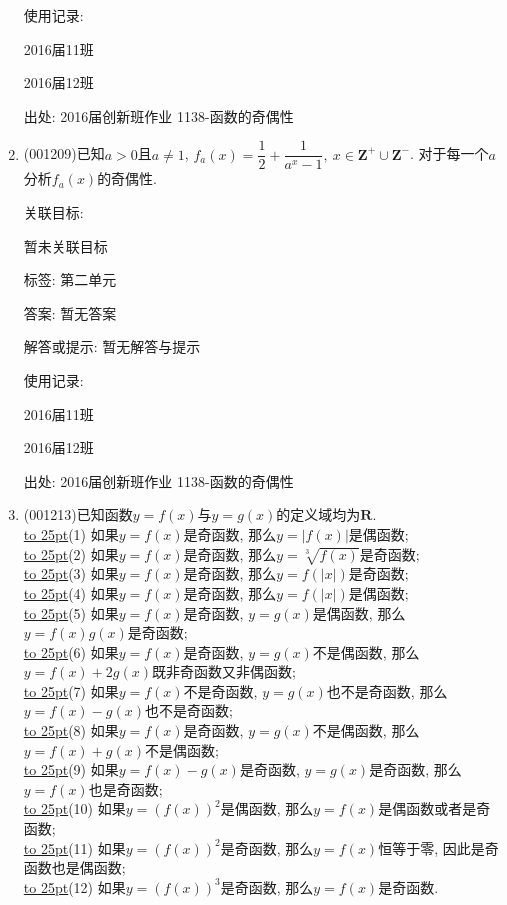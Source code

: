 \documentclass[10pt,a4paper]{article}
\newcommand{\blank}[1]{\underline{\hbox to #1pt{}}}
\begin{document}
\begin{enumerate}[1.]
使用记录:

2016届11班	

2016届12班	


出处: 2016届创新班作业	1138-函数的奇偶性
\item { (001209)}已知$a>0$且$a\ne 1$, $f_a(x)=\dfrac{1}{2}+\dfrac{1}{a^x-1},\ x \in \mathbf{Z}^+\cup \mathbf{Z}^-$. 对于每一个$a$分析$f_a(x)$的奇偶性.


关联目标:

暂未关联目标



标签: 第二单元

答案: 暂无答案

解答或提示: 暂无解答与提示

使用记录:

2016届11班	

2016届12班	


出处: 2016届创新班作业	1138-函数的奇偶性
\item { (001213)}已知函数$y=f(x)$与$y=g(x)$的定义域均为$\mathbf{R}$.\\ 
\blank{25}(1) 如果$y=f(x)$是奇函数, 那么$y=|f(x)|$是偶函数;\\ 
\blank{25}(2) 如果$y=f(x)$是奇函数, 那么$y=\sqrt[3]{f(x)}$是奇函数;\\ 
\blank{25}(3) 如果$y=f(x)$是奇函数, 那么$y=f(|x|)$是奇函数;\\ 
\blank{25}(4) 如果$y=f(x)$是奇函数, 那么$y=f(|x|)$是偶函数;\\ 
\blank{25}(5) 如果$y=f(x)$是奇函数, $y=g(x)$是偶函数, 那么$y=f(x)g(x)$是奇函数;\\ 
\blank{25}(6) 如果$y=f(x)$是奇函数, $y=g(x)$不是偶函数, 那么$y=f(x)+2g(x)$既非奇函数又非偶函数;\\ 
\blank{25}(7) 如果$y=f(x)$不是奇函数, $y=g(x)$也不是奇函数, 那么$y=f(x)-g(x)$也不是奇函数;\\ 
\blank{25}(8) 如果$y=f(x)$是奇函数, $y=g(x)$不是偶函数, 那么$y=f(x)+g(x)$不是偶函数;\\ 
\blank{25}(9) 如果$y=f(x)-g(x)$是奇函数, $y=g(x)$是奇函数, 那么$y=f(x)$也是奇函数;\\ 
\blank{25}(10) 如果$y=(f(x))^2$是偶函数, 那么$y=f(x)$是偶函数或者是奇函数;\\ 
\blank{25}(11) 如果$y=(f(x))^2$是奇函数, 那么$y=f(x)$恒等于零, 因此是奇函数也是偶函数;\\ 
\blank{25}(12) 如果$y=(f(x))^3$是奇函数, 那么$y=f(x)$是奇函数.



\end{enumerate}
\end{document}
